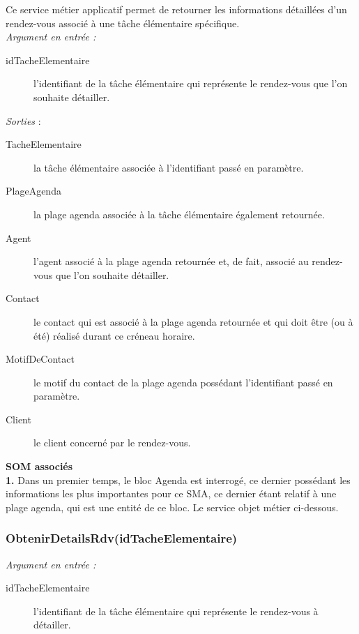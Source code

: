 Ce service métier applicatif permet de retourner les informations détaillées d'un rendez-vous associé à une tâche élémentaire spécifique.\\

\noindent \textit{Argument en entrée :}
\begin{description}
\item[idTacheElementaire] l'identifiant de la tâche élémentaire qui représente le rendez-vous que l'on souhaite détailler. \\
\end{description}

\noindent \textit{Sorties} : 
\begin{description}
\item[TacheElementaire] la tâche élémentaire associée à l'identifiant passé en paramètre.
\item[PlageAgenda] la plage agenda associée à la tâche élémentaire également retournée.
\item[Agent] l'agent associé à la plage agenda retournée et, de fait, associé au rendez-vous que l'on souhaite détailler. 
\item[Contact] le contact qui est associé à la plage agenda retournée et qui doit être (ou à été) réalisé durant ce créneau horaire.
\item[MotifDeContact] le motif du contact de la plage agenda possédant l'identifiant passé en paramètre. 
\item[Client] le client concerné par le rendez-vous. \\
\end{description}


\begin{shaded}
\textbf{SOM associés}\\
\textbf{1.} Dans un premier temps, le bloc Agenda est interrogé, ce dernier possédant les informations les plus importantes pour ce SMA, ce dernier étant relatif à une plage agenda, qui est une entité de ce bloc. Le service objet métier ci-dessous.
\end{shaded}


\subsubsection{ObtenirDetailsRdv(idTacheElementaire)}

\noindent \textit{Argument en entrée :}
\begin{description}
\item[idTacheElementaire] l'identifiant de la tâche élémentaire qui représente le rendez-vous à détailler. \\
\end{description}

